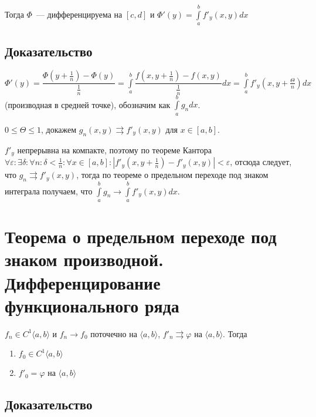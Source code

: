 \documentclass{article}
\begin{document}
        Тогда $\Phi$~--- дифференцируема на $[c, d]$ и $\Phi'(y) = \int\limits^b_a f'_y (x, y) dx$
            
        \subsection{Доказательство} 
            
            $\Phi'(y) = \dfrac{\Phi \left( y + \frac{1}{n} \right) - \Phi(y)}{\frac{1}{n}} = \int\limits^b_a \dfrac{f \left( x, y + \frac{1}{n} \right) - f(x, y)}{\frac{1}{n}} dx = \int\limits^b_a f'_y \left(x, y + \frac{\Theta}{n} \right) dx$ (производная в средней точке), обозначим как $\int\limits^b_a g_n dx$.
            
            $0 \leqslant \Theta \leqslant 1$, докажем $g_n(x, y) \rightrightarrows f'_y (x, y)$ для $x \in [a, b]$.
            
            $f'_y$ непрерывна на компакте, поэтому по теореме Кантора $\forall \varepsilon : \exists \delta : \forall n : \delta < \frac{1}{n} : \forall x \in [a, b] : \left| f'_y \left( x, y + \frac{1}{n} \right) - f'_y(x, y) \right| < \varepsilon$, отсюда следует, что $g_n \rightrightarrows f'_y(x, y)$, тогда по теореме о предельном переходе под знаком интеграла получаем, что $\int\limits^b_a g_n \rightarrow \int\limits^b_a f'_y (x, y) dx$.
            
    \newpage
    
    \section{Теорема о предельном переходе под знаком производной. Дифференцирование функционального ряда}
    
        $f_n \in C^1 \langle a, b \rangle$ и $f_n \rightarrow f_0$ поточечно на $\langle a, b \rangle$, $f'_n \rightrightarrows \varphi$ на $\langle a, b \rangle$. Тогда 
        
        \begin{enumerate}
        
            \item $f_0 \in C^1 \langle a, b \rangle$
            
            \item $f'_0 = \varphi$ на $\langle a, b \rangle$
            
        \end{enumerate}
        
        \subsection{Доказательство}
        
\end{document}
